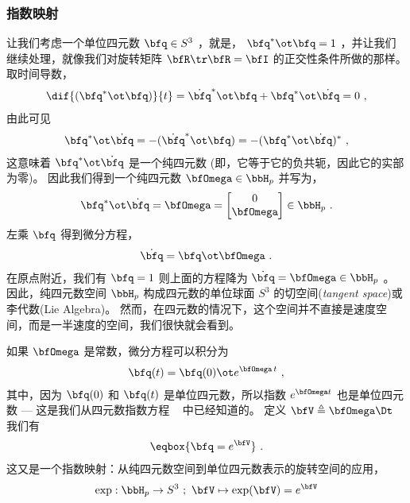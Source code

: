 \subsubsection{指数映射}

让我们考虑一个单位四元数 $\bfq\in S^3$ ，就是， $\bfq^*\ot\bfq=1$ ，并让我们继续处理，就像我们对旋转矩阵 $\bfR\tr\bfR=\bfI$ 的正交性条件所做的那样。
取时间导数，
%
\begin{align}
\dif{(\bfq^*\ot\bfq)}{t} = \dot\bfq^*\ot\bfq+\bfq^*\ot\dot\bfq=0
~,
\end{align}
%
由此可见
%
\begin{align}
\bfq^*\ot\dot\bfq = -(\dot\bfq^*\ot\bfq) = -(\bfq^*\ot\dot\bfq)^*~,
\end{align}
%
这意味着 $\bfq^*\ot\dot\bfq$ 是一个纯四元数 (即，它等于它的负共轭，因此它的实部为零)。
因此我们得到一个纯四元数 $\bfOmega\in\bbH_p$ 并写为，
%
\begin{align}
\bfq^*\ot\dot\bfq = \bfOmega = \begin{bmatrix}
0\\\bfOmega
\end{bmatrix} 
\in\bbH_p
~.
\end{align}
%
左乘 $\bfq$ 得到微分方程，
%
\begin{align}
\label{equ:qdotOmega}
\dot\bfq = \bfq\ot\bfOmega~.
\end{align}
% 
在原点附近，我们有 $\bfq=1$ 则上面的方程降为 $\dot\bfq=\bfOmega\in\bbH_p$ 。
因此，纯四元数空间 $\bbH_p$ 构成四元数的单位球面 $S^3$ 的切空间(\emph{tangent space})或李代数(Lie Algebra)。 
然而，在四元数的情况下，这个空间并不直接是速度空间，而是一半速度的空间，我们很快就会看到。


如果 $\bfOmega$ 是常数，微分方程可以积分为
%
\begin{align}\label{equ:qexpWt}
\bfq(t) = \bfq(0)\ot e^{\bfOmega\, t}
~,
\end{align}
%
其中，因为 $\bfq(0)$ 和 $\bfq(t)$ 是单位四元数，所以指数 $e^{\bfOmega t}$ 也是单位四元数 --- 这是我们从四元数指数方程 ~ 中已经知道的。
%
定义 $\bfV\triangleq\bfOmega\Dt$ 我们有
%
\begin{align}\label{equ:qexpV}
\eqbox{
\bfq = e^{\bfV}
}~.
\end{align}
%
这又是一个指数映射：从纯四元数空间到单位四元数表示的旋转空间的应用，
%
\begin{align}\label{equ:q_expmap}
\exp:\bbH_p\to S^3~;~ \bfV\mapsto \exp(\bfV) = e^{\bfV}
\end{align}
%

